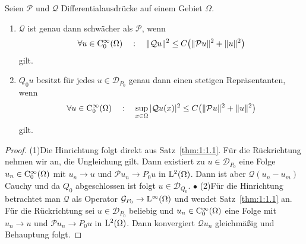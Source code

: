 \begin{lem}
Seien $\mathcal P$ und $\mathcal Q$ Differentialausdr\"ucke auf einem Gebiet $\Omega$. 
\begin{enumerate}
\item[(1)]
$\mathcal Q$ ist genau dann schwächer als $\mathcal P$, wenn
\begin{equation}
    \forall u\in\mathrm C^\infty_0(\Omega)\quad:\quad \|\mathcal Qu\|^2 \le C \big( \|\mathcal Pu\|^2 + \|u\|^2 \big)
\end{equation}
gilt.
\item[(2)] $Q_0 u$ besitzt für jedes $u\in\mathcal D_{P_0}$ genau dann einen stetigen Repräsentanten, wenn
\begin{equation}
    \forall u\in\mathrm C^\infty_0(\Omega)\quad:\quad  \sup_{x\in\Omega} |\mathcal Qu(x) |^2 \le C \big( \|\mathcal Pu\|^2 + \|u\|^2 \big)
\end{equation}
gilt.
\end{enumerate}
\end{lem}
\begin{proof}
(1)\quad Die Hinrichtung folgt direkt aus Satz~\ref{thm:1:1.1}. Für die Rückrichtung nehmen wir an, die Ungleichung gilt. Dann existiert zu $u\in\mathcal D_{P_0}$ eine Folge $u_n\in\mathrm C_0^\infty(\Omega)$ mit $u_n\to u$ und $\mathcal P u_n\to P_0 u$ in $\mathrm L^2(\Omega)$. Dann ist aber $\mathcal Q(u_n-u_m)$ Cauchy und da $Q_0$ abgeschlossen ist folgt $u\in\mathcal D_{Q_0}$. $\bullet$\qquad
(2)\quad Für die Hinrichtung betrachtet man $\mathcal Q$ als Operator $\mathcal G_{P_0}\to\mathrm L^\infty(\Omega)$ und wendet Satz~\ref{thm:1:1.1} an. Für die Rückrichtung sei $u\in\mathcal D_{P_0}$ beliebig und $u_n\in\mathrm C_0^\infty(\Omega)$ eine Folge mit $u_n\to u$ und $\mathcal Pu_n\to P_0u$ in $\mathrm L^2(\Omega)$.
Dann konvergiert $\mathcal Qu_n$ gleichmäßig und Behauptung folgt.
\end{proof}

